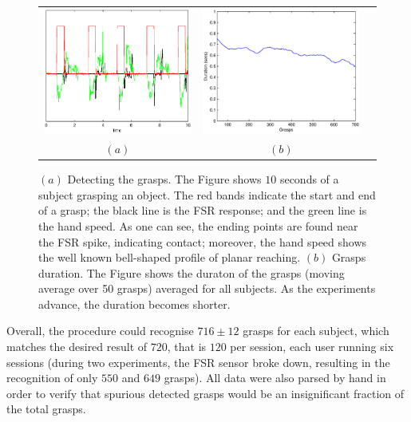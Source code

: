 \begin{figure}[htbp]
  \begin{center}
    \begin{tabular}{ccc}
      \includegraphics[width=0.48\linewidth]{grasp_seq_scotch.eps} &
      \includegraphics[width=0.48\linewidth]{grasp_trend.eps} \\
      $(a)$ & $(b)$
    \end{tabular}
    \caption{$(a)$ Detecting the grasps. The Figure shows $10$ seconds
    of a subject grasping an object. The red bands indicate the start
    and end of a grasp; the black line is the FSR response; and the
    green line is the hand speed. As one can see, the ending points
    are found near the FSR spike, indicating contact; moreover, the
    hand speed shows the well known bell-shaped profile of planar reaching. 
    $(b)$ Grasps duration. The Figure shows the duraton of the
    grasps (moving average over 50 grasps) averaged for all
    subjects. As the experiments advance, the duration becomes shorter.}
    \label{fig:grasp_sequence}
  \end{center}
\end{figure}

Overall, the procedure could recognise $716 \pm 12$ grasps for each
subject, which matches the desired result of $720$, that is $120$ per
session, each user running six sessions (during two experiments, the
FSR sensor broke down, resulting in the recognition of only $550$ and
$649$ grasps). All data were also parsed by hand in order to verify
that spurious detected grasps would be an insignificant fraction of
the total grasps.

